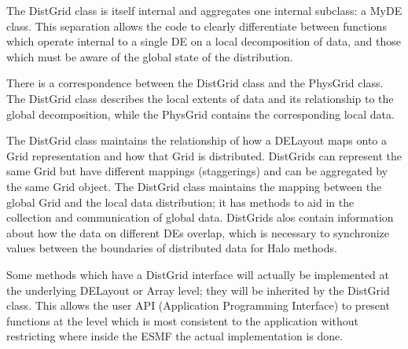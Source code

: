 



The DistGrid class is itself internal and aggregates one internal
subclass: a MyDE class.  This separation allows the code to clearly
differentiate between functions which operate internal to a single DE
on a local decomposition of data, and those which must be aware of the
global state of the distribution.

There is a correspondence between the DistGrid class and the PhysGrid
class.  The DistGrid class describes the local extents of data and
its relationship to the global decomposition, while the PhysGrid contains 
the corresponding local data.  

The DistGrid class maintains the relationship of how a DELayout maps onto
a Grid representation and how that Grid is distributed.  DistGrids can
represent the same Grid but have different mappings (staggerings) and can
be aggregated by the same Grid object. The DistGrid class maintains the
mapping between the global Grid and the local data distribution;  it has
methods to aid in the collection and communication of global data.  
DistGrids alos contain information about how the data on different DEs
overlap, which is necessary to synchronize values between the boundaries
of distributed data for Halo methods.

Some methods which have a DistGrid interface will actually be
implemented at the underlying DELayout or Array level; they
will be inherited by the DistGrid class.  This allows the user
API (Application Programming Interface) to present functions at
the level which is most consistent to the application without
restricting where inside the ESMF the actual implementation
is done.
